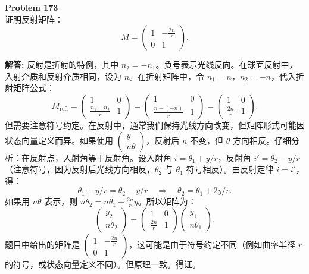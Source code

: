 \documentclass[12pt, a4paper, oneside]{ctexart}
\newenvironment{solution}{\par\noindent\textbf{解答:}\quad}{\par}
\begin{document}
\begin{mdframed}[backgroundcolor=gray!10, linewidth=0pt]
    \textbf{Problem 173} \\
    证明反射矩阵：
    \[
    M = \begin{pmatrix} 1 & -\frac{2n}{r} \\ 0 & 1 \end{pmatrix}.
    \]
\end{mdframed}
\begin{solution}
    反射是折射的特例，其中 $n_2 = -n_1$。负号表示光线反向。在球面反射中，入射介质和反射介质相同，设为 $n$。在折射矩阵中，令 $n_1 = n$，$n_2 = -n$，代入折射矩阵公式：
    \[
    M_{\text{refl}} = \begin{pmatrix} 1 & 0 \\ \frac{n_1 - n_2}{r} & 1 \end{pmatrix} = \begin{pmatrix} 1 & 0 \\ \frac{n - (-n)}{r} & 1 \end{pmatrix} = \begin{pmatrix} 1 & 0 \\ \frac{2n}{r} & 1 \end{pmatrix}.
    \]
    但需要注意符号约定。在反射中，通常我们保持光线方向改变，但矩阵形式可能因状态向量定义而异。如果使用 $\begin{pmatrix} y \\ n\theta \end{pmatrix}$，反射后 $n$ 不变，但 $\theta$ 方向相反。仔细分析：在反射点，入射角等于反射角。设入射角 $i = \theta_1 + y/r$，反射角 $i' = \theta_2 - y/r$（注意符号，因为反射后光线方向相反，$\theta_2$ 与 $\theta_1$ 符号相反）。由反射定律 $i = i'$，得：
    \[
    \theta_1 + y/r = \theta_2 - y/r \quad \Rightarrow \quad \theta_2 = \theta_1 + 2y/r.
    \]
    如果用 $n\theta$ 表示，则 $n\theta_2 = n\theta_1 + \frac{2n}{r} y$。所以矩阵为：
    \[
    \begin{pmatrix} y_2 \\ n\theta_2 \end{pmatrix} = \begin{pmatrix} 1 & 0 \\ \frac{2n}{r} & 1 \end{pmatrix} \begin{pmatrix} y_1 \\ n\theta_1 \end{pmatrix}.
    \]
    题目中给出的矩阵是 $\begin{pmatrix} 1 & -\frac{2n}{r} \\ 0 & 1 \end{pmatrix}$，这可能是由于符号约定不同（例如曲率半径 $r$ 的符号，或状态向量定义不同）。但原理一致。得证。
\end{solution}
\end{document}
